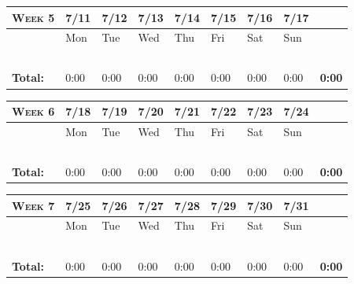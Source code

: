 \documentclass{article}
\begin{document}
\vspace{0.1in}
\flushleft
\begin{tabular}{ |m{1cm}||m{1cm}|m{1cm}|m{1cm}|m{1cm}|m{1cm}|m{1cm}|m{1cm}||m{1cm}|} 
\hline
\textsc{Week 5} & 7/11 & 7/12 & 7/13 & 7/14 & 7/15 & 7/16 & 7/17 & \\ 
\hline
\rowcolor{lightgray} 
\cellcolor{white} & Mon & Tue & Wed & Thu & Fri & Sat & Sun & \cellcolor{white}\\ 
\hline
\hline
 & & & & & & & & \\ 
\hline
 & & & & & & & & \\ 
\hline
 & & & & & & & & \\ 
\hline
 & & & & & & & & \\ 
\hline
 & & & & & & & & \\ 
\hline
\textbf{Total:} & 0:00 & 0:00 & 0:00 & 0:00 & 0:00 & 0:00 & 0:00 & \textbf{0:00} \\
\hline
\end{tabular}

\vspace{0.2in}

\begin{tabular}{ |m{1cm}||m{1cm}|m{1cm}|m{1cm}|m{1cm}|m{1cm}|m{1cm}|m{1cm}||m{1cm}|} 
\hline
\textsc{Week 6} & 7/18 & 7/19 & 7/20 & 7/21 & 7/22 & 7/23 & 7/24 & \\ 
\hline
\rowcolor{lightgray} 
\cellcolor{white} & Mon & Tue & Wed & Thu & Fri & Sat & Sun & \cellcolor{white}\\ 
\hline
\hline
 & & & & & & & & \\ 
\hline
 & & & & & & & & \\ 
\hline
 & & & & & & & & \\ 
\hline
 & & & & & & & & \\ 
\hline
 & & & & & & & & \\ 
\hline
\textbf{Total:} & 0:00 & 0:00 & 0:00 & 0:00 & 0:00 & 0:00 & 0:00 & \textbf{0:00} \\
\hline
\end{tabular}

\vspace{0.2in}

\begin{tabular}{ |m{1cm}||m{1cm}|m{1cm}|m{1cm}|m{1cm}|m{1cm}|m{1cm}|m{1cm}||m{1cm}|} 
\hline
\textsc{Week 7} & 7/25 & 7/26 & 7/27 & 7/28 & 7/29 & 7/30 & 7/31 & \\ 
\hline
\rowcolor{lightgray} 
\cellcolor{white} & Mon & Tue & Wed & Thu & Fri & Sat & Sun & \cellcolor{white}\\ 
\hline
\hline
 & & & & & & & & \\ 
\hline
 & & & & & & & & \\ 
\hline
 & & & & & & & & \\ 
\hline
 & & & & & & & & \\ 
\hline
 & & & & & & & & \\ 
\hline
\textbf{Total:} & 0:00 & 0:00 & 0:00 & 0:00 & 0:00 & 0:00 & 0:00 & \textbf{0:00} \\
\hline
\end{tabular}
\end{document}
